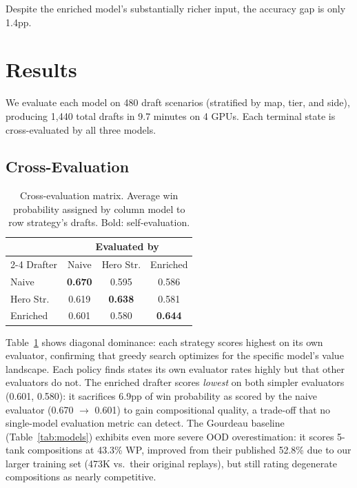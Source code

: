 \documentclass[conference]{IEEEtran}
\begin{document}
Despite the enriched model's substantially richer input, the accuracy gap is only 1.4pp.

\section{Results}

We evaluate each model on 480 draft scenarios (stratified by map, tier, and side), producing 1,440 total drafts in 9.7 minutes on 4 GPUs. Each terminal state is cross-evaluated by all three models.

\subsection{Cross-Evaluation}

\begin{table}[t]
\centering
\caption{Cross-evaluation matrix. Average win probability assigned by column model to row strategy's drafts. Bold: self-evaluation.}
\label{tab:crosseval}
\begin{tabular}{lccc}
\toprule
& \multicolumn{3}{c}{Evaluated by} \\
\cmidrule(lr){2-4}
Drafter & Naive & Hero Str. & Enriched \\
\midrule
Naive & \textbf{0.670} & 0.595 & 0.586 \\
Hero Str. & 0.619 & \textbf{0.638} & 0.581 \\
Enriched & 0.601 & 0.580 & \textbf{0.644} \\
\bottomrule
\end{tabular}
\end{table}

Table~\ref{tab:crosseval} shows diagonal dominance: each strategy scores highest on its own evaluator, confirming that greedy search optimizes for the specific model's value landscape. Each policy finds states its own evaluator rates highly but that other evaluators do not. The enriched drafter scores \textit{lowest} on both simpler evaluators (0.601, 0.580): it sacrifices 6.9pp of win probability as scored by the naive evaluator (0.670 $\to$ 0.601) to gain compositional quality, a trade-off that no single-model evaluation metric can detect. The Gourdeau baseline (Table~\ref{tab:models}) exhibits even more severe OOD overestimation: it scores 5-tank compositions at 43.3\% WP, improved from their published 52.8\% due to our larger training set (473K vs.\ their original replays), but still rating degenerate compositions as nearly competitive.
\end{document}
